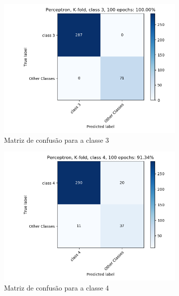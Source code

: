 \documentclass[paper=a4, fontsize=11pt]{scrartcl}
\numberwithin{equation}{section}		%
\numberwithin{figure}{section}			%
\numberwithin{table}{section}				%
\begin{document}
\begin{figure}[h!]
\begin{subfigure}{.5\textwidth}
			\includegraphics[width=\linewidth]{img/q3_fig_kfold_classe3.png}
			\caption{Matriz de confusão para a classe 3}
			\label{fig:q1grau4}
		\end{subfigure}%
		\begin{subfigure}{.5\textwidth}
			\centering
			\includegraphics[width=\linewidth]{img/q3_fig_kfold_classe4.png}
			\caption{Matriz de confusão para a classe 4}
			\label{fig:q1_grau5}
		\end{subfigure}
		\begin{subfigure}{.5\textwidth}
			\centering

\end{subfigure}
\end{figure}
\end{document}
